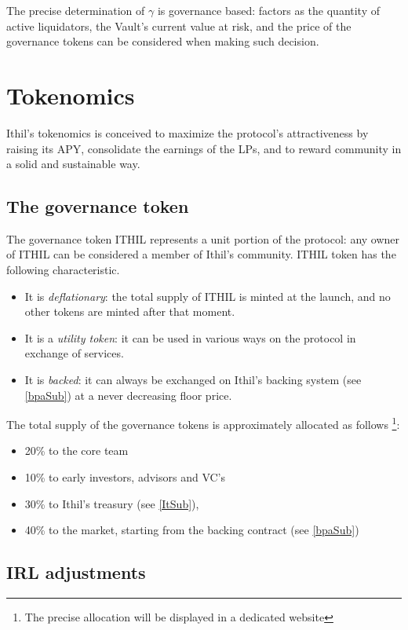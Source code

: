 \documentclass[a4paper,10 pt]{article}
\theoremstyle{definition}
\begin{document}
The precise determination of $\gamma$ is governance based: factors as the quantity of active liquidators, the Vault's current value at risk, and the price of the governance tokens can be considered when making such decision.

\section{Tokenomics}\label{tokSec}

Ithil's tokenomics is conceived to maximize the protocol's attractiveness by raising its APY, consolidate the earnings of the LPs, and to reward community in a solid and sustainable way.

\subsection{The governance token}\label{govSub}
The governance token ITHIL represents a unit portion of the protocol: any owner of ITHIL can be considered a member of Ithil's community. ITHIL token has the following characteristic.
\begin{itemize}
\item It is {\it deflationary}: the total supply of ITHIL is minted at the launch, and no other tokens are minted after that moment.
\item It is a {\it utility token}: it can be used in various ways on the protocol in exchange of services.
\item It is {\it backed}: it can always be exchanged on Ithil's backing system (see \ref{bpaSub}) at a never decreasing floor price.
\end{itemize}

The total supply of the governance tokens is approximately allocated as follows  \footnote{The precise allocation will be displayed in a dedicated website}:
\begin{itemize}
\item 20\% to the core team
\item 10\% to early investors, advisors and VC's
\item 30\% to Ithil's treasury (see \ref{ItSub}), 
\item 40\% to the market, starting from the backing contract (see \ref{bpaSub})
\end{itemize}

\subsection{IRL adjustments}\label{irladjSub}
\end{document}
